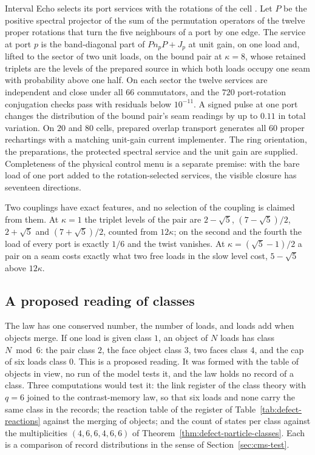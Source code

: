 Interval Echo selects its port services with the rotations of the cell \cite{ophmodel}.
Let $P$ be the positive spectral projector of the sum of the permutation operators of the
twelve proper rotations that turn the five neighbours of a port by one edge. The service
at port $p$ is the band-diagonal part of $Pn_pP+J_p$ at unit gain, on one load and, lifted
to the sector of two unit loads, on the bound pair at $\kappa=8$, whose retained triplets
are the levels of the prepared source in which both loads occupy one seam with
probability above one half. On
each sector the twelve services are independent and close under all $66$ commutators, and
the $720$ port-rotation conjugation checks pass with residuals below $10^{-11}$. A signed
pulse at one port changes the distribution of the bound pair's seam readings by up to
$0.11$ in total variation. On $20$ and $80$ cells, prepared overlap transport generates
all $60$ proper rechartings with a matching unit-gain current implementer. The ring
orientation, the preparations, the protected spectral service and the unit gain are
supplied. Completeness of the physical control menu is a separate premise: with the bare
load of one port added to the rotation-selected services, the visible closure has
seventeen directions.

Two couplings have exact features, and no selection of the coupling is claimed from
them. At $\kappa=1$ the triplet levels of the pair are $2-\sqrt5$, $(7-\sqrt5)/2$,
$2+\sqrt5$ and $(7+\sqrt5)/2$, counted from $12\kappa$; on the second and the fourth the
load of every port is exactly $1/6$ and the twist vanishes. At $\kappa=(\sqrt5-1)/2$ a pair
on a seam costs exactly what two free loads in the slow level cost, $5-\sqrt5$ above
$12\kappa$.

\subsection{A proposed reading of classes}
\label{sec:cms-class-reading}

The law has one conserved number, the number of loads, and loads add when objects merge.
If one load is given class $1$, an object of $N$ loads has class
$N\bmod 6$: the pair class $2$, the face object class $3$, two faces class $4$, and the cap
of six loads class $0$. This is a proposed reading. It was formed with the table of
objects in view, no run of the model tests it, and the law holds no record of a class.
Three computations would test it: the link register of the class theory with $q=6$ joined
to the contrast-memory law, so that six loads and none carry the same class in the
records; the reaction table of the register of
Table~\ref{tab:defect-reactions} against the merging of objects; and the count of states
per class against the multiplicities $(4,6,6,4,6,6)$ of
Theorem~\ref{thm:defect-particle-classes}. Each is a comparison of record distributions in
the sense of Section~\ref{sec:cms-test}.

